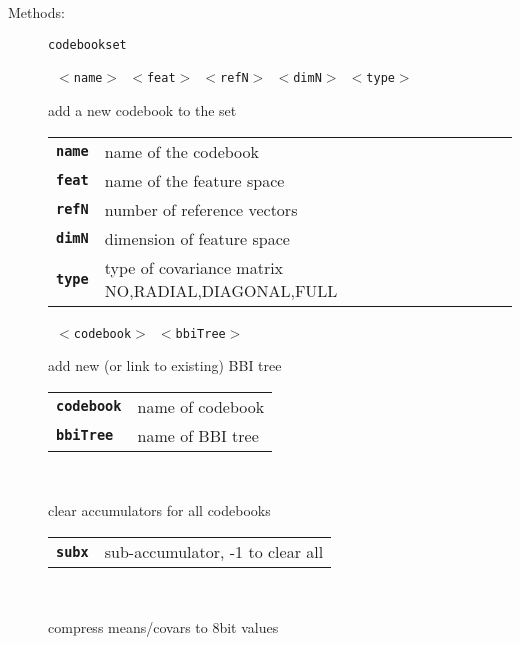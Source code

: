 \begin{description}
\vspace{3mm} \item[Methods:] \texttt{codebookset}

    \begin{description}
       \texttt{ $<$name$>$ $<$feat$>$ $<$refN$>$ $<$dimN$>$ $<$type$>$} \

        add a new codebook to the set

      \begin{tabular}{ll}
 \texttt{\textbf{name}} &  name of the codebook  \\
 \texttt{\textbf{feat}} &  name of the feature space  \\
 \texttt{\textbf{refN}} &  number of reference vectors  \\
 \texttt{\textbf{dimN}} &  dimension of feature space  \\
 \texttt{\textbf{type}} &  type of covariance matrix {NO,RADIAL,DIAGONAL,FULL} \\
      \end{tabular}
       \texttt{ $<$codebook$>$ $<$bbiTree$>$} \

        add new (or link to existing) BBI tree

      \begin{tabular}{ll}
 \texttt{\textbf{codebook}} &  name of codebook  \\
 \texttt{\textbf{bbiTree}} &   name of BBI tree  \\
      \end{tabular}
       \texttt{ } \

        clear accumulators for all codebooks

      \begin{tabular}{ll}
 \texttt{\textbf{subx}} &  sub-accumulator, -1 to clear all  \\
      \end{tabular}
       \texttt{         } \

        compress means/covars to 8bit values


\end{description}
\end{description}
